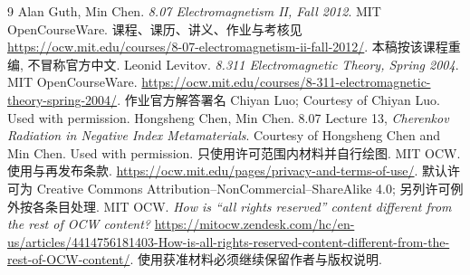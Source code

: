 \begin{thebibliography}{9}
 Alan Guth, Min Chen. \textit{8.07 Electromagnetism II, Fall 2012}. MIT OpenCourseWare. 课程、课历、讲义、作业与考核见 \url{https://ocw.mit.edu/courses/8-07-electromagnetism-ii-fall-2012/}. 本稿按该课程重编, 不冒称官方中文.
 Leonid Levitov. \textit{8.311 Electromagnetic Theory, Spring 2004}. MIT OpenCourseWare. \url{https://ocw.mit.edu/courses/8-311-electromagnetic-theory-spring-2004/}. 作业官方解答署名 Chiyan Luo; Courtesy of Chiyan Luo. Used with permission.
 Hongsheng Chen, Min Chen. 8.07 Lecture 13, \textit{Cherenkov Radiation in Negative Index Metamaterials}. Courtesy of Hongsheng Chen and Min Chen. Used with permission. 只使用许可范围内材料并自行绘图.
 MIT OCW. 使用与再发布条款. \url{https://ocw.mit.edu/pages/privacy-and-terms-of-use/}. 默认许可为 Creative Commons Attribution--NonCommercial--ShareAlike 4.0; 另列许可例外按各条目处理.
 MIT OCW. \textit{How is ``all rights reserved'' content different from the rest of OCW content?} \url{https://mitocw.zendesk.com/hc/en-us/articles/4414756181403-How-is-all-rights-reserved-content-different-from-the-rest-of-OCW-content/}. 使用获准材料必须继续保留作者与版权说明.
\end{thebibliography}
